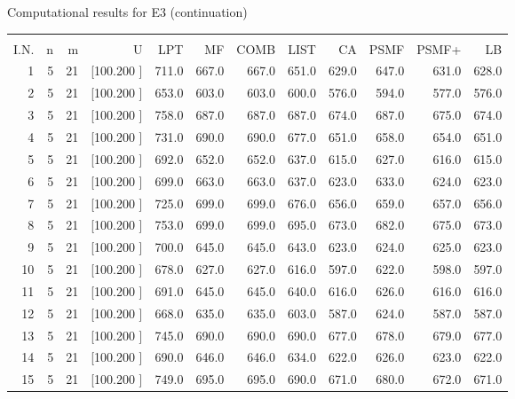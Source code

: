 \documentclass[12pt,a4paper]{article}
\begin{document}
\newpage
\begin{center}
 Computational results for E3 (continuation) {\tiny
\begin{tabular}{r r r r r r r r r r r r}\hline
    &   &   &          &        &        &        &        &        &        &        &       \\[-0.1in]
  I.N.  &  n  &  m  &  U  &  LPT  &  MF  &  COMB  &  LIST  &  CA  & PSMF &PSMF+ & LB \\[0.03in]
\hline
   1&  5& 21&[100.200   ]&   711.0&   667.0&   667.0&   651.0&   629.0&   647.0&   631.0&   628.0\\[-0.02in]
   2&  5& 21&[100.200   ]&   653.0&   603.0&   603.0&   600.0&   576.0&   594.0&   577.0&   576.0\\[-0.02in]
   3&  5& 21&[100.200   ]&   758.0&   687.0&   687.0&   687.0&   674.0&   687.0&   675.0&   674.0\\[-0.02in]
   4&  5& 21&[100.200   ]&   731.0&   690.0&   690.0&   677.0&   651.0&   658.0&   654.0&   651.0\\[-0.02in]
   5&  5& 21&[100.200   ]&   692.0&   652.0&   652.0&   637.0&   615.0&   627.0&   616.0&   615.0\\[-0.02in]
   6&  5& 21&[100.200   ]&   699.0&   663.0&   663.0&   637.0&   623.0&   633.0&   624.0&   623.0\\[-0.02in]
   7&  5& 21&[100.200   ]&   725.0&   699.0&   699.0&   676.0&   656.0&   659.0&   657.0&   656.0\\[-0.02in]
   8&  5& 21&[100.200   ]&   753.0&   699.0&   699.0&   695.0&   673.0&   682.0&   675.0&   673.0\\[-0.02in]
   9&  5& 21&[100.200   ]&   700.0&   645.0&   645.0&   643.0&   623.0&   624.0&   625.0&   623.0\\[-0.02in]
  10&  5& 21&[100.200   ]&   678.0&   627.0&   627.0&   616.0&   597.0&   622.0&   598.0&   597.0\\[-0.02in]
  11&  5& 21&[100.200   ]&   691.0&   645.0&   645.0&   640.0&   616.0&   626.0&   616.0&   616.0\\[-0.02in]
  12&  5& 21&[100.200   ]&   668.0&   635.0&   635.0&   603.0&   587.0&   624.0&   587.0&   587.0\\[-0.02in]
  13&  5& 21&[100.200   ]&   745.0&   690.0&   690.0&   690.0&   677.0&   678.0&   679.0&   677.0\\[-0.02in]
  14&  5& 21&[100.200   ]&   690.0&   646.0&   646.0&   634.0&   622.0&   626.0&   623.0&   622.0\\[-0.02in]
  15&  5& 21&[100.200   ]&   749.0&   695.0&   695.0&   690.0&   671.0&   680.0&   672.0&   671.0\\[-0.02in]

\end{tabular}}
\end{center}
\end{document}
